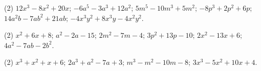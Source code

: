 \documentclass[11pt,a4paper]{scrartcl}
\begin{document}
\newpage
\answerssection

\begin{problem} \phantom{text}
\begin{tasks}[label={(\arabic*)}, label-offset=0.9em](2)
	\task $12x^3-8x^2+20x$;
	\task $-6a^5-3a^3+12a^2$;
	\task $5m^5-10m^3+5m^2$;
	\task $-8p^3+2p^2+6p$;
	\task $14a^2b-7ab^2+21ab$;
	\task $-4x^3y^2+8x^3y-4x^2y^2$.
\end{tasks}
\end{problem}

\begin{problem} \phantom{text}
\begin{tasks}[label={(\arabic*)}, label-offset=0.9em](2)
	\task $x^2+6x+8$;
	\task $a^2-2a-15$;
	\task $2m^2-7m-4$;
	\task $3p^2+13p-10$;
	\task $2x^2-13x+6$;
	\task $4a^2-7ab-2b^2$.
\end{tasks}
\end{problem}

\begin{problem} \phantom{text}
\begin{tasks}[label={(\arabic*)}, label-offset=0.9em](2)
	\task $x^3+x^2+x+6$;
	\task $2a^3+a^2-7a+3$;
	\task $m^3-m^2-10m-8$;
	\task $3x^3-5x^2+10x+4$.
\end{tasks}
\end{problem}
\end{document}
